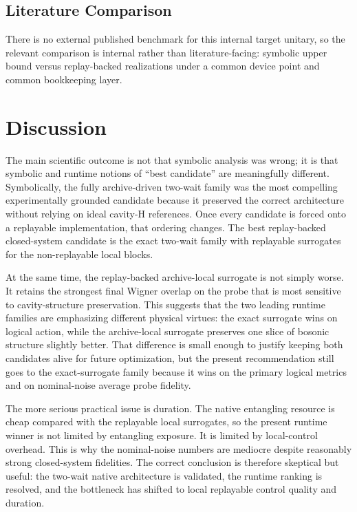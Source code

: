 \documentclass[aps,pra,twocolumn,reprint,amsmath,amssymb]{revtex4-2}
\begin{document}
\subsection{Literature Comparison}

There is no external published benchmark for this internal target unitary, so
the relevant comparison is internal rather than literature-facing: symbolic
upper bound versus replay-backed realizations under a common device point and
common bookkeeping layer.

\section{Discussion}

The main scientific outcome is not that symbolic analysis was wrong; it is that
symbolic and runtime notions of ``best candidate'' are meaningfully different.
Symbolically, the fully archive-driven two-wait family was the most compelling
experimentally grounded candidate because it preserved the correct architecture
without relying on ideal cavity-H references. Once every candidate is forced
onto a replayable implementation, that ordering changes. The best replay-backed
closed-system candidate is the exact two-wait family with replayable surrogates
for the non-replayable local blocks.

At the same time, the replay-backed archive-local surrogate is not simply worse.
It retains the strongest final Wigner overlap on the probe that is most sensitive
to cavity-structure preservation. This suggests that the two leading runtime
families are emphasizing different physical virtues: the exact surrogate wins on
logical action, while the archive-local surrogate preserves one slice of bosonic
structure slightly better. That difference is small enough to justify keeping
both candidates alive for future optimization, but the present recommendation
still goes to the exact-surrogate family because it wins on the primary logical
metrics and on nominal-noise average probe fidelity.

The more serious practical issue is duration. The native entangling resource is
cheap compared with the replayable local surrogates, so the present runtime
winner is not limited by entangling exposure. It is limited by local-control
overhead. This is why the nominal-noise numbers are mediocre despite reasonably
strong closed-system fidelities. The correct conclusion is therefore skeptical
but useful: the two-wait native architecture is validated, the runtime ranking is
resolved, and the bottleneck has shifted to local replayable control quality and
duration.
\end{document}
